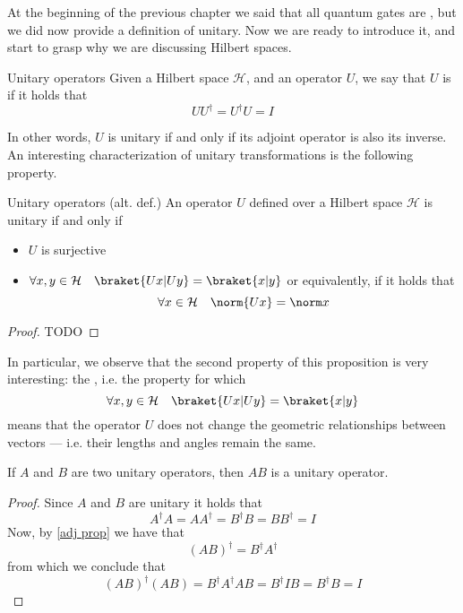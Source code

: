 \documentclass[a4paper, 12pt]{report}
\begin{document}
At the beginning of the previous chapter we said that all quantum gates are , but we did now provide a definition of unitary. Now we are ready to introduce it, and start to grasp why we are discussing Hilbert spaces.

\begin{frameddefn}{Unitary operators}
	Given a Hilbert space $\mathcal H$, and an operator $U$, we say that $U$ is  if it holds that $$UU^\dag = U^\dag U = I$$
\end{frameddefn}

In other words, $U$ is unitary if and only if its adjoint operator is also its inverse. An interesting characterization of unitary transformations is the following property.

\begin{framedprop}{Unitary operators (alt. def.)}
	An operator $U$ defined over a Hilbert space $\mathcal H$ is unitary if and only if

	\begin{itemize}
		\item $U$ is surjective
		\item $\forall x, y \in \mathcal H \quad \braket{Ux|Uy} = \braket{x|y}$ or equivalently, if it holds that $$\forall x \in \mathcal H \quad \norm{Ux} = \norm x$$
	\end{itemize}
\end{framedprop}

\begin{proof}
    TODO 
\end{proof}

In particular, we observe that the second property of this proposition is very interesting: the , i.e. the property for which $$\forall x, y \in \mathcal H \quad \braket{Ux|Uy} = \braket{x|y}$$ means that the operator $U$ does not change the geometric relationships between vectors --- i.e. their lengths and angles remain the same.

\begin{framedprop}[label={unitary prod}]{}
    If $A$ and $B$ are two unitary operators, then $AB$ is a unitary operator.
\end{framedprop}

\begin{proof}
    Since $A$ and $B$ are unitary it holds that $$A ^\dag A = A A^ \dag = B ^ \dag B = B B^ \dag = I$$ Now, by \cref{adj prop} we have that $$(AB)^ \dag = B^\dag A^\dag$$ from which we conclude that $$(AB)^\dag(AB) = B^\dag A^\dag AB = B^\dag I B = B^\dag B = I$$
\end{proof}
\end{document}
